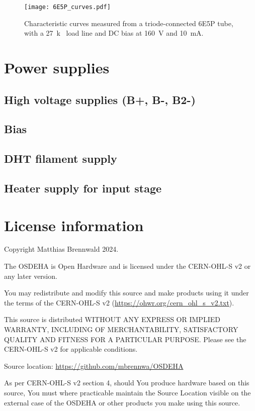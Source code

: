 \begin{figure}
\begin{center}
\texttt{[image: 6E5P\_curves.pdf]}
\caption{Characteristic curves measured from a triode-connected 6E5P tube, with a \SI{27}{k\Ohm} load line and DC bias at \SI{160}{V} and \SI{10}{mA}.}
\end{center}
\end{figure}


\section{Power supplies}

\subsection{High voltage supplies (B+, B-, B2-)}

\subsection{Bias}

\subsection{DHT filament supply}

\subsection{Heater supply for input stage}


\section{License information} 
Copyright Matthias Brennwald 2024.                                                    

The OSDEHA is Open Hardware and is licensed under the CERN-OHL-S v2 or any later version.

You may redistribute and modify this source and make products using it under the terms of the CERN-OHL-S v2 (\url{https://ohwr.org/cern_ohl_s_v2.txt}).

This source is distributed WITHOUT ANY EXPRESS OR IMPLIED WARRANTY, INCLUDING OF MERCHANTABILITY, SATISFACTORY QUALITY AND FITNESS FOR A PARTICULAR PURPOSE. Please see the CERN-OHL-S v2 for applicable conditions.

Source location: \url{https://github.com/mbrennwa/OSDEHA}

As per CERN-OHL-S v2 section 4, should You produce hardware based on this source, You must where practicable maintain the Source Location visible on the external case of the OSDEHA or other products you make using this source.            






